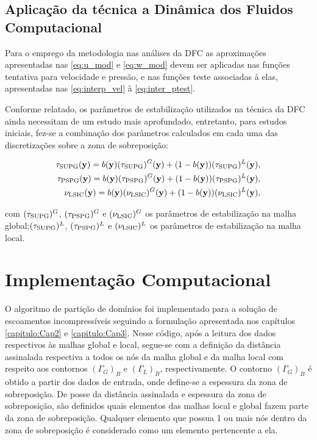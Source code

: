 \subsection{Aplicação da técnica a Dinâmica dos Fluidos Computacional}

Para o emprego da metodologia nas análises da DFC as aproximações apresentadas nas \autoref{eq:u_mod} e \autoref{eq:w_mod} devem ser aplicadas nas funções tentativa para velocidade e pressão, e nas funções teste associadas à elas, apresentadas nas \autoref{eq:interp_vel} à \autoref{eq:inter_ptest}.

Conforme relatado, os parâmetros de estabilização utilizados na técnica da DFC ainda necessitam de um estudo mais aprofundado, entretanto, para estudos iniciais, fez-se a combinação dos parâmetros calculados em cada uma das discretizações sobre a zona de sobreposição:

\begin{align}
\tau_{\mathrm{SUPG}}(\mathbf{y}) =  b(\mathbf{y})(\tau_{\mathrm{SUPG}})^{G}(\mathbf{y}) + (1-b(\mathbf{y}))(\tau_{\mathrm{SUPG}})^{L}(\mathbf{y}),\\
\tau_{\mathrm{PSPG}}(\mathbf{y}) =  b(\mathbf{y})(\tau_{\mathrm{PSPG}})^{G}(\mathbf{y}) + (1-b(\mathbf{y}))(\tau_{\mathrm{PSPG}})^{L}(\mathbf{y}),\\
\nu_{\mathrm{LSIC}}(\mathbf{y}) =  b(\mathbf{y})(\nu_{\mathrm{LSIC}})^{G}(\mathbf{y}) + (1-b(\mathbf{y}))(\nu_{\mathrm{LSIC}})^{L}(\mathbf{y}),
\end{align}

\noindent com $(\tau_{\mathrm{SUPG}})^{G}$, $(\tau_{\mathrm{PSPG}})^{G}$ e $(\nu_{\mathrm{LSIC}})^{G}$ os parâmetros de estabilização na malha global;$(\tau_{\mathrm{SUPG}})^{L}$, $(\tau_{\mathrm{PSPG}})^{L}$ e  $(\nu_{\mathrm{LSIC}})^{L}$ os parâmetros de estabilização na malha local.

\section{Implementação Computacional}

O algoritmo de partição de domínios foi implementado para a solução de escoamentos incompressíveis seguindo a formulação apresentada nos capítulos \ref{capitulo:Cap2} e \ref{capitulo:Cap3}. Nesse código, após a leitura dos dados respectivos às malhas global e local, segue-se com a definição da distância assinalada respectiva a todos os nós da malha global e da malha local com respeito aos contornos $(\Gamma_{G})_{B}$ e $(\Gamma_{L})_{B}$, respectivamente. O contorno  $(\Gamma_{G})_{B}$ é obtido a partir dos dados de entrada, onde define-se a espessura da zona de sobreposição. De posse da distância assinalada e espessura da zona de sobreposição, são definidos quais elementos das malhas local e global fazem parte da zona de sobreposição. Qualquer elemento que possua 1 ou mais nós dentro da zona de sobreposição é considerado como um elemento pertencente a ela.

